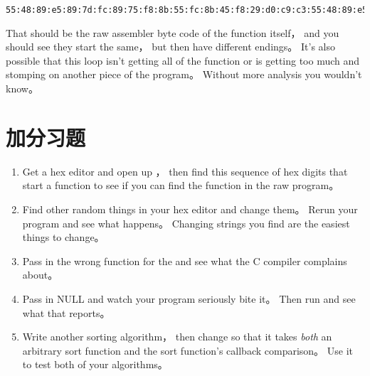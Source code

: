 \begin{Verbatim}
55:48:89:e5:89:7d:fc:89:75:f8:8b:55:fc:8b:45:f8:29:d0:c9:c3:55:48:89:e5:89:
\end{Verbatim}

That should be the raw assembler byte code of the function itself， and you
should see they start the same， but then have different endings。  It's also
possible that this loop isn't getting all of the function or is getting too
much and stomping on another piece of the program。  Without more analysis
you wouldn't know。

\section{加分习题}

\begin{enumerate}
\item Get a hex editor and open up ， then find this sequence
    of hex digits that start a function to see if you can find the function
    in the raw program。
\item Find other random things in your hex editor and change them。  Rerun your
    program and see what happens。  Changing strings you find are the easiest
    things to change。
\item Pass in the wrong function for the  and see what
    the C compiler complains about。
\item Pass in NULL and watch your program seriously bite it。  Then run
     and see what that reports。
\item Write another sorting algorithm， then change  so
    that it takes \emph{both} an arbitrary sort function and the sort function's
    callback comparison。  Use it to test both of your algorithms。
\end{enumerate}


